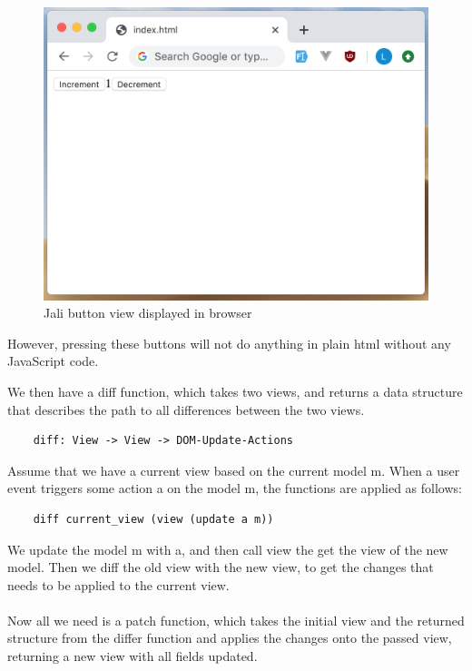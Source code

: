 \begin{figure}
    \centering
    \includegraphics[width=\textwidth]{images/jali-button-in-browser.png}
    \caption{Jali button view displayed in browser}
    \label{fig:jali-buttons-in-browser}
\end{figure}

However, pressing these buttons will not do anything in plain html without any JavaScript code. 




We then have a diff function, which takes two views, and returns a data structure that describes the path to all differences between the two views.

\begin{verbatim}
    diff: View -> View -> DOM-Update-Actions
\end{verbatim}

Assume that we have a current view based on the current model m. When a user event triggers some action a on the model m, the functions are applied as follows:

\begin{verbatim}
    diff current_view (view (update a m))
\end{verbatim}

We update the model m with a, and then call view the get the view of the new model. Then we diff the old view with the new view, to get the changes that needs to be applied to the current view. 
\\\\
Now all we need is a patch function, which takes the initial view and the returned structure from the differ function and applies the changes onto the passed view, returning a new view with all fields updated.

